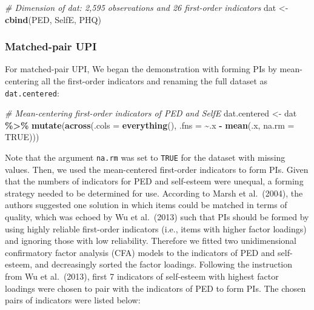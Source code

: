 \documentclass[
  man]{apa7}
\newenvironment{Shaded}{\begin{snugshade}}{\end{snugshade}}
\newcommand{\AttributeTok}[1]{\textcolor[rgb]{0.13,0.29,0.53}{#1}}
\newcommand{\CommentTok}[1]{\textcolor[rgb]{0.56,0.35,0.01}{\textit{#1}}}
\newcommand{\ConstantTok}[1]{\textcolor[rgb]{0.56,0.35,0.01}{#1}}
\newcommand{\FunctionTok}[1]{\textcolor[rgb]{0.13,0.29,0.53}{\textbf{#1}}}
\newcommand{\NormalTok}[1]{#1}
\newcommand{\OtherTok}[1]{\textcolor[rgb]{0.56,0.35,0.01}{#1}}
\newcommand{\SpecialCharTok}[1]{\textcolor[rgb]{0.81,0.36,0.00}{\textbf{#1}}}
\begin{document}
\footnotesize

\begin{Shaded}
\begin{Highlighting}[]
\CommentTok{\# Dimension of dat: 2,595 observations and 26 first{-}order indicators}
\NormalTok{dat }\OtherTok{\textless{}{-}} \FunctionTok{cbind}\NormalTok{(PED, SelfE, PHQ)}
\end{Highlighting}
\end{Shaded}

\normalsize

\hypertarget{matched-pair-upi}{%
\subsubsection{Matched-pair UPI}\label{matched-pair-upi}}

For matched-pair UPI, We began the demonstration with forming PIs by mean-centering all the first-order indicators and renaming the full dataset as \texttt{dat.centered}:

\footnotesize

\begin{Shaded}
\begin{Highlighting}[]
\CommentTok{\# Mean{-}centering first{-}order indicators of PED and SelfE}
\NormalTok{dat.centered }\OtherTok{\textless{}{-}}\NormalTok{ dat }\SpecialCharTok{\%\textgreater{}\%}
    \FunctionTok{mutate}\NormalTok{(}\FunctionTok{across}\NormalTok{(}\AttributeTok{.cols =} \FunctionTok{everything}\NormalTok{(), }\AttributeTok{.fns =} \SpecialCharTok{\textasciitilde{}}\NormalTok{.x }\SpecialCharTok{{-}} \FunctionTok{mean}\NormalTok{(.x, }\AttributeTok{na.rm =} \ConstantTok{TRUE}\NormalTok{)))}
\end{Highlighting}
\end{Shaded}

\normalsize
Note that the argument \texttt{na.rm} was set to \texttt{TRUE} for the dataset with missing values. Then, we used the mean-centered first-order indicators to form PIs. Given that the numbers of indicators for PED and self-esteem were unequal, a forming strategy needed to be determined for use. According to Marsh et al.~(2004), the authors suggested one solution in which items could be matched in terms of quality, which was echoed by Wu et al.~(2013) such that PIs should be formed by using highly reliable first-order indicators (i.e., items with higher factor loadings) and ignoring those with low reliability. Therefore we fitted two unidimensional confirmatory factor analysis (CFA) models to the indicators of PED and self-esteem, and decreasingly sorted the factor loadings. Following the instruction from Wu et al.~(2013), first 7 indicators of self-esteem with highest factor loadings were chosen to pair with the indicators of PED to form PIs. The chosen pairs of indicators were listed below:
\end{document}
